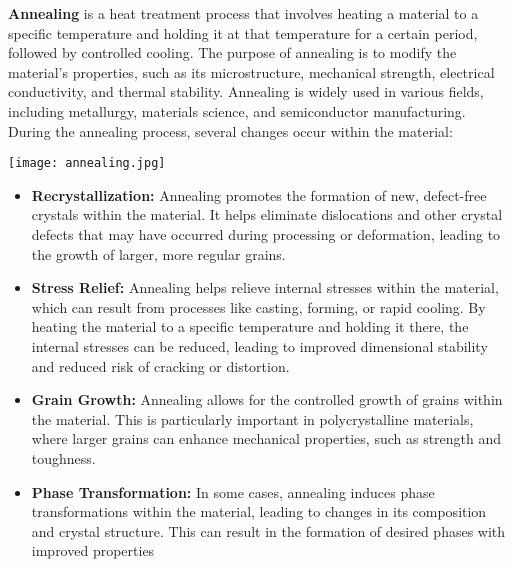 \documentclass[../synthesisAndCharacter.tex]{subfiles}
\begin{document}
    \textbf{Annealing} is a heat treatment process that involves heating a material to a specific temperature and holding 
    it at that temperature for a certain period, followed by controlled cooling. The purpose of annealing is to 
    modify the material's properties, such as its microstructure, mechanical strength, electrical conductivity, 
    and thermal stability. Annealing is widely used in various fields, including metallurgy, materials science, 
    and semiconductor manufacturing. During the annealing process, several changes occur within the material:
    \begin{Figure}
        \centering
        \texttt{[image: annealing.jpg]}
        \label{fig:annealing}
    \end{Figure}
    \begin{itemize}
        \item \textbf{Recrystallization:} Annealing promotes the formation of new, defect-free crystals within the 
        material. It helps eliminate dislocations and other crystal defects that may have occurred during 
        processing or deformation, leading to the growth of larger, more regular grains.
        \item \textbf{Stress Relief: } Annealing helps relieve internal stresses within the material, which can 
        result from processes like casting, forming, or rapid cooling. By heating the material to a specific 
        temperature and holding it there, the internal stresses can be reduced, leading to improved dimensional 
        stability and reduced risk of cracking or distortion.
        \item \textbf{Grain Growth: }Annealing allows for the controlled growth of grains within the material. 
        This is particularly important in polycrystalline materials, where larger grains can enhance mechanical 
        properties, such as strength and toughness.
        \item \textbf{Phase Transformation: }In some cases, annealing induces phase transformations within the 
        material, leading to changes in its composition and crystal structure. This can result in the formation 
        of desired phases with improved properties
    \end{itemize}
\end{document}
